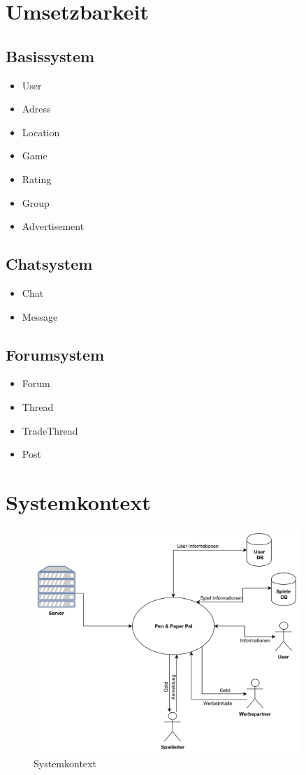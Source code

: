 \documentclass[DIV=13, 10pt,a4paper]{scrartcl} %
\begin{document}
\section{Umsetzbarkeit}
\begin{multicols}{2}
	\subsection*{Basissystem}
		\begin{itemize}
			\item User
			\item Adress
			\item Location
			\item Game
			\item Rating
			\item Group
			\item Advertisement
		\end{itemize}
	\subsection*{Chatsystem}
		\begin{itemize}
			\item Chat
			\item Message
		\end{itemize}
	\subsection*{Forumsystem}
		\begin{itemize}
			\item Forum
			\item Thread
			\item TradeThread
			\item Post
		\end{itemize}
\end{multicols}

\section{Systemkontext}
\begin{figure}[h!]
	\centering
	\includegraphics[width = 0.9\textwidth]{docs/03_03_Systemkontext.jpg}
	\caption{Systemkontext}
 \end{figure}
\end{document}
